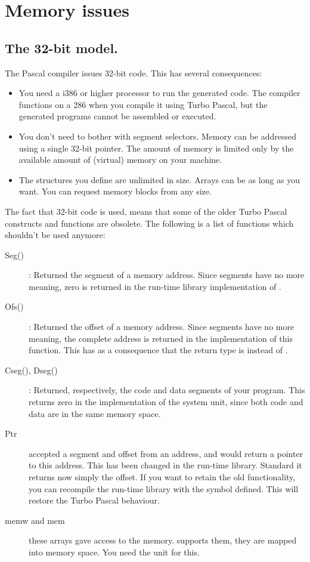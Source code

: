 \documentclass{report}
\begin{document}
\chapter{Memory issues}
\label{ch:Memory}

\section{The 32-bit model.}
\label{se:ThirtytwoBit}
The \fpc Pascal compiler issues 32-bit code. This has several consequences:
\begin{itemize}
\item You need a i386 or higher processor to run the generated code. The
compiler functions on a 286 when you compile it using Turbo Pascal, 
but the generated programs cannot be assembled or executed.
\item You don't need to bother with segment selectors. Memory can be
addressed using a single 32-bit pointer. 
The amount of memory is limited only by the available amount of (virtual) 
memory on your machine.
\item The structures you define are unlimited in size. Arrays can be as long
as you want. You can request memory blocks from any size.
\end{itemize}

The fact that 32-bit code is used, means that some of the older Turbo Pascal
constructs and functions are obsolete. The following is a list of functions
which shouldn't be used anymore:
\begin{description}
\item [Seg()] : Returned the segment of a memory address. Since segments have
no more meaning, zero is returned in the \fpc run-time library implementation of
.
\item [Ofs()] : Returned the offset of a memory address. Since segments have
no more meaning, the complete address is returned in the \fpc implementation
of this function. This has as a consequence that the return type is 
 instead of .
\item [Cseg(), Dseg()] : Returned, respectively, the code and data segments 
of your program.  This returns zero in the \fpc implementation of the 
system unit, since both code and data are in the same memory space.
\item [Ptr] accepted a segment and offset from an address, and would return
a pointer to this address. This has been changed in the run-time library.
Standard it returns now simply the offset. If you want to retain the old
functionality, you can recompile the run-time library with the
 symbol defined. This will restore the Turbo Pascal
behaviour.
\item [memw and mem] these arrays gave access to the \dos memory. \fpc
supports them, they are mapped into \dos memory space. You need the
 unit for this. 
\end{description}
\end{document}

